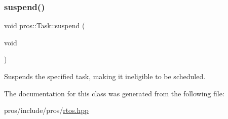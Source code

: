 \subsubsection{\texorpdfstring{suspend()}{suspend()}}
{\footnotesize\ttfamily void pros\+::\+Task\+::suspend (\begin{DoxyParamCaption}\item[{void}]{ }\end{DoxyParamCaption})}

Suspends the specified task, making it ineligible to be scheduled. 

The documentation for this class was generated from the following file\+:\begin{DoxyCompactItemize}
\item 
pros/include/pros/\hyperlink{rtos_8hpp}{rtos.\+hpp}\end{DoxyCompactItemize}
